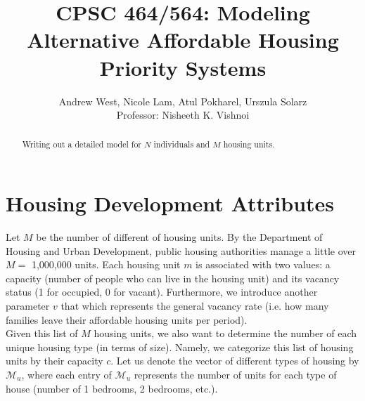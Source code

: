 \documentclass[11pt]{article}
\title{\bf CPSC 464/564: Modeling Alternative Affordable Housing Priority Systems}
\author{Andrew West, Nicole Lam, Atul Pokharel, Urszula Solarz \\
Professor: Nisheeth K. Vishnoi
}
\begin{document}
\maketitle
 
\begin{abstract}
Writing out a detailed model for $N$ individuals and $M$ housing units. 
\end{abstract}
\section{Housing Development Attributes}
Let $M$ be the number of different of housing units. By the Department of Housing and Urban Development, public housing authorities manage a little over $M = $ 1,000,000 units. Each housing unit $m$ is associated with two values: a capacity (number of people who can live in the housing unit) and its vacancy status (1 for occupied, 0 for vacant). Furthermore, we introduce another parameter $v$ that which represents the general vacancy rate (i.e. how many families leave their affordable housing units per period). \\
\newline
Given this list of $M$ housing units, we also want to determine the number of each unique housing type (in terms of size). Namely, we categorize this list of housing units by their capacity $c$. Let us denote the vector of different types of housing by $\mathcal{M}_u$, where each entry of $\mathcal{M}_u$ represents the number of units for each type of house (number of 1 bedrooms, 2 bedrooms, etc.). 
\end{document}
